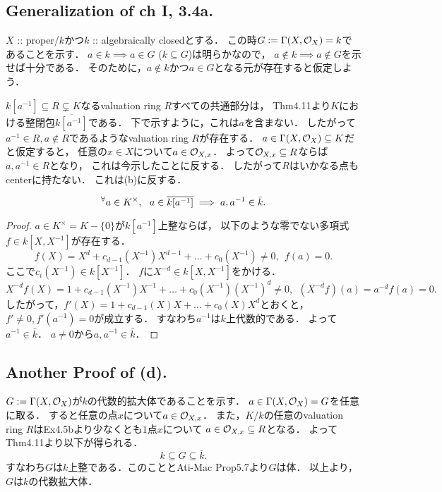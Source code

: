 \documentclass[a4paper]{jsarticle}
\begin{document}
    \subsection{Generalization of ch I, 3.4a.}
    $X$ :: proper/$k$かつ$k$ :: algebraically closedとする．
    この時$G:=\Gamma(X, \mathcal{O}_X)=k$であることを示す．
    $a \in k \implies a \in G$
    ($k \subseteq G$)は明らかなので，
    $a \not \in k \implies a \not \in G$を示せば十分である．
    そのために，$a \not \in k$かつ$a \in G$となる元が存在すると仮定しよう．

    $k[a^{-1}] \subseteq R \subsetneq K$なるvaluation ring $R$すべての共通部分は，
    Thm4.11より$K$における整閉包$\overline{k[a^{-1}]}$である．
    下で示すように，これは$a$を含まない．
    したがって$a^{-1} \in R, a \not \in R$であるようなvaluation ring $R$が存在する．
    $a \in \Gamma(X, \mathcal{O}_X) \subseteq K$だと仮定すると，
    任意の$x \in X$について$a \in \mathcal{O}_{X,x}$．
    よって$\mathcal{O}_{X,x} \subseteq R$ならば$a,a^{-1} \in R$となり，
    これは今示したことに反する．
    したがって$R$はいかなる点もcenterに持たない．
    これは(b)に反する．

    \begin{Claim}
        \[ {}^{\forall} a \in K^{\times},~~ a \in \overline{k[a^{-1}]} \implies a,a^{-1} \in \bar{k}. \] 
    \end{Claim}
    \begin{proof}
        $a \in K^{\times}=K-\{0\}$が$k[a^{-1}]$上整ならば，
        以下のような零でない多項式$f \in k[X, X^{-1}]$が存在する．
        \[
            f(X)=X^d+c_{d-1}(X^{-1})X^{d-1}+\dots+c_0(X^{-1}) \neq 0 ,~~
            f(a)=0.
        \]
        ここで$c_i(X^{-1}) \in k[X^{-1}]$．
        $f$に$X^{-d} \in k[X,X^{-1}]$をかける．
        \[
            X^{-d}f(X)=1+c_{d-1}(X^{-1})X^{-1}+\dots+c_0(X^{-1})(X^{-1})^d \neq 0,~~
            (X^{-d}f)(a)=a^{-d}f(a)=0.
        \]
        したがって，$f'(X)=1+c_{d-1}(X)X+\dots+c_0(X)X^d$とおくと，
        $f' \neq 0, f'(a^{-1})=0$が成立する．
        すなわち$a^{-1}$は$k$上代数的である．
        よって$a^{-1} \in \bar{k}$．
        $a \neq 0$から$a,a^{-1} \in \bar{k}$．
    \end{proof}

    \subsection*{Another Proof of (d).}
    $G:=\Gamma(X,\mathcal{O}_X)$が$k$の代数的拡大体であることを示す．
    $a \in \Gamma(X,\mathcal{O}_X)=G$を任意に取る．
    すると任意の点$x$について$a \in \mathcal{O}_{X,x}$．
    また，$K/k$の任意のvaluation ring $R$はEx4.5bより少なくとも$1$点$x$について
    $a \in \mathcal{O}_{X,x} \subseteq R$となる．
    よってThm4.11より以下が得られる．
    \[ k \subseteq G \subseteq \bar{k}. \]
    すなわち$G$は$k$上整である．このこととAti-Mac Prop5.7より$G$は体．
    以上より，$G$は$k$の代数拡大体．
\end{document}
